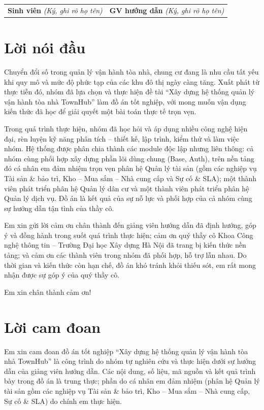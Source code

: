 \begin{center}{\singlespacing\renewcommand{\arraystretch}{1.25}
\begin{tabular}{>{\centering\arraybackslash}p{}>{\centering\arraybackslash}p{}}
\textbf{Sinh viên} \newline \textit{(Ký, ghi rõ họ tên)} & \textbf{GV hướng dẫn} \newline \textit{(Ký, ghi rõ họ tên)} \\
\end{tabular}}\end{center}
\chapter*{Lời nói đầu}
Chuyển đổi số trong quản lý vận hành tòa nhà, chung cư đang là nhu cầu tất yếu khi quy mô và mức độ phức tạp của các khu đô thị ngày càng tăng. Xuất phát từ thực tiễn đó, nhóm đã lựa chọn và thực hiện đề tài ``Xây dựng hệ thống quản lý vận hành tòa nhà TownHub'' làm đồ án tốt nghiệp, với mong muốn vận dụng kiến thức đã học để giải quyết một bài toán thực tế trọn vẹn.

Trong quá trình thực hiện, nhóm đã học hỏi và áp dụng nhiều công nghệ hiện đại, rèn luyện kỹ năng phân tích – thiết kế, lập trình, kiểm thử và làm việc nhóm. Hệ thống được phân chia thành các module độc lập nhưng liên thông: cả nhóm cùng phối hợp xây dựng phần lõi dùng chung (Base, Auth), trên nền tảng đó cá nhân em đảm nhiệm trọn vẹn phân hệ Quản lý tài sản (gồm các nghiệp vụ Tài sản \& bảo trì, Kho – Mua sắm – Nhà cung cấp và Sự cố \& SLA); một thành viên phát triển phân hệ Quản lý dân cư và một thành viên phát triển phân hệ Quản lý dịch vụ. Đồ án là kết quả của sự nỗ lực và phối hợp của cả nhóm cùng sự hướng dẫn tận tình của thầy cô.

Em xin gửi lời cảm ơn chân thành đến giảng viên hướng dẫn đã định hướng, góp ý và đồng hành trong suốt quá trình thực hiện; cảm ơn quý thầy cô Khoa Công nghệ thông tin – Trường Đại học Xây dựng Hà Nội đã trang bị kiến thức nền tảng; và cảm ơn các thành viên trong nhóm đã phối hợp, hỗ trợ lẫn nhau. Do thời gian và kiến thức còn hạn chế, đồ án khó tránh khỏi thiếu sót, em rất mong nhận được sự góp ý của quý thầy cô.

Em xin chân thành cảm ơn!

\chapter*{Lời cam đoan}
Em xin cam đoan đồ án tốt nghiệp ``Xây dựng hệ thống quản lý vận hành tòa nhà TownHub'' là công trình do nhóm tự nghiên cứu và thực hiện dưới sự hướng dẫn của giảng viên hướng dẫn. Các nội dung, số liệu, mã nguồn và kết quả trình bày trong đồ án là trung thực; phần do cá nhân em đảm nhiệm (phân hệ Quản lý tài sản gồm các nghiệp vụ Tài sản \& bảo trì, Kho – Mua sắm – Nhà cung cấp, Sự cố \& SLA) do chính em thực hiện.

